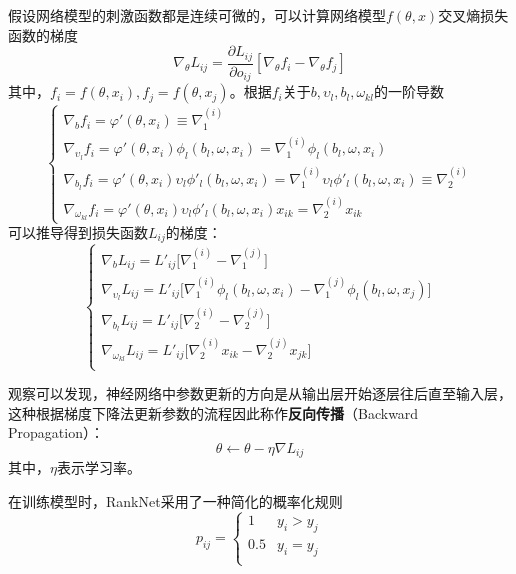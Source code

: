 假设网络模型的刺激函数都是连续可微的，可以计算网络模型$f(\theta,x)$交叉熵损失函数的梯度
\begin{equation}\label{eq:ranknet-gradient}
    \nabla_{\theta} L_{ij} = \frac{\partial L_{ij}}{\partial o_{ij}} [\nabla_{\theta} f_i- \nabla_{\theta} f_j]
\end{equation}
其中，$f_i=f(\theta,x_i),f_j=f(\theta,x_j)$。根据$f_i$关于$b,\upsilon_l,b_l,\omega_{kl}$的一阶导数
\begin{equation}
    \left\{
    \begin{array}{l}
      \nabla_b f_i = \varphi'(\theta,x_i) \equiv \nabla_1^{(i)} \\
      \nabla_{\upsilon_l} f_i = \varphi'(\theta,x_i) \phi_l(b_l,\omega,x_i) = \nabla_1^{(i)}  \phi_l(b_l,\omega,x_i) \\
      \nabla_{b_l} f_i = \varphi'(\theta,x_i) \upsilon_l \phi'_l(b_l,\omega,x_i) = \nabla_1^{(i)} \upsilon_l \phi'_l(b_l,\omega,x_i) \equiv \nabla_2^{(i)} \\
      \nabla_{\omega_{kl}} f_i = \varphi'(\theta,x_i) \upsilon_l \phi'_l(b_l,\omega,x_i) x_{ik} = \nabla_2^{(i)} x_{ik}
    \end{array}
    \right.
\end{equation}
可以推导得到损失函数$L_{ij}$的梯度：
\begin{equation}
    \left\{
    \begin{array}{l}
      \nabla_b L_{ij} = L'_{ij} \big[\nabla_1^{(i)} - \nabla_1^{(j)}\big]\\
      \nabla_{\upsilon_l} L_{ij} = L'_{ij} \big[\nabla_1^{(i)}  \phi_l(b_l,\omega,x_i) - \nabla_1^{(j)}  \phi_l(b_l,\omega,x_j)\big] \\
      \nabla_{b_l} L_{ij}= L'_{ij} \big[\nabla_2^{(i)} - \nabla_2^{(j)}\big] \\
      \nabla_{\omega_{kl}} L_{ij} = L'_{ij} \big[\nabla_2^{(i)} x_{ik} - \nabla_2^{(j)} x_{jk}\big] \\
    \end{array}
    \right.
\end{equation}

观察可以发现，神经网络中参数更新的方向是从输出层开始逐层往后直至输入层，这种根据梯度下降法更新参数的流程因此称作\textbf{反向传播}（Backward Propagation）：
\begin{equation}
    \theta \leftarrow \theta - \eta \nabla L_{ij}
\end{equation}
其中，$\eta$表示学习率。

在训练模型时，RankNet采用了一种简化的概率化规则
\begin{equation}
    p_{ij} = \left\{
        \begin{array}{ll}
          1 & y_i > y_j \\
          0.5 & y_i = y_j \\
        \end{array}
    \right.
\end{equation}

